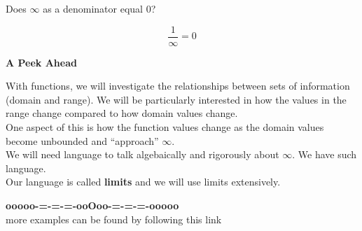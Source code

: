 \documentclass{ximera}
\begin{document}
\begin{question}
Does $\infty$ as a denominator equal $0$?

\[  \frac{1}{\infty} = 0 \]


\begin{multipleChoice}
\end{multipleChoice}


\end{question}











\textbf{\textcolor{purple!85!blue}{A Peek Ahead}} 


With functions, we will investigate the relationships between sets of information (domain and range).  We will be particularly interested in how the values in the range change compared to how domain values change. \\

One aspect of this is how the function values change as the domain values become unbounded and ``approach'' $\infty$. \\

We will need language to talk algebaically and rigorously about $\infty$. We have such language.  \\


Our language is called \textbf{limits} and we will use limits extensively.\\











\begin{onlineOnly}
\begin{center}
\textbf{\textcolor{green!50!black}{ooooo-=-=-=-ooOoo-=-=-=-ooooo}} \\

more examples can be found by following this link\\ 

\end{center}
\end{onlineOnly}
\end{document}
